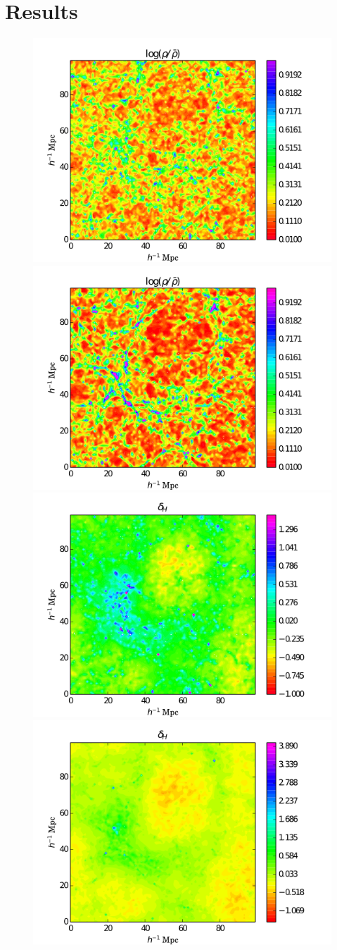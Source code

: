 \documentclass[twocolumns]{emulateapj}
\begin{document}
\section{Results}
\begin{figure}
  \centering
\includegraphics[width = .45\textwidth ]{data_rho_z3_qso4.png}
\includegraphics[width = .45\textwidth ]{data_rho_z1_qso4.png}
\includegraphics[width = .45\textwidth ]{data_delta_z3_gal2.png}
\includegraphics[width = .45\textwidth ]{data_delta_z1_gal2.png}


\end{figure}
\end{document}
